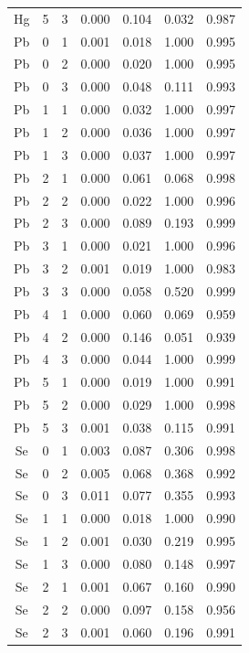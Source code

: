 \documentclass[ms, hidelinks]{uncgdissertationexp3}
\theoremstyle{plain}
\theoremstyle{definition}
\theoremstyle{remark}
\begin{document}
\begin{longtable}{ccccccc}
  Hg & 5 & 3 & 0.000 & 0.104 & 0.032 & 0.987\\
  \rowcolor{gray!6}  Pb & 0 & 1 & 0.001 & 0.018 & 1.000 & 0.995\\
  Pb & 0 & 2 & 0.000 & 0.020 & 1.000 & 0.995\\
  \rowcolor{gray!6}  Pb & 0 & 3 & 0.000 & 0.048 & 0.111 & 0.993\\
  Pb & 1 & 1 & 0.000 & 0.032 & 1.000 & 0.997\\
  \rowcolor{gray!6}  Pb & 1 & 2 & 0.000 & 0.036 & 1.000 & 0.997\\
  Pb & 1 & 3 & 0.000 & 0.037 & 1.000 & 0.997\\
  \rowcolor{gray!6}  Pb & 2 & 1 & 0.000 & 0.061 & 0.068 & 0.998\\
  Pb & 2 & 2 & 0.000 & 0.022 & 1.000 & 0.996\\
  \rowcolor{gray!6}  Pb & 2 & 3 & 0.000 & 0.089 & 0.193 & 0.999\\
  Pb & 3 & 1 & 0.000 & 0.021 & 1.000 & 0.996\\
  \rowcolor{gray!6}  Pb & 3 & 2 & 0.001 & 0.019 & 1.000 & 0.983\\
  Pb & 3 & 3 & 0.000 & 0.058 & 0.520 & 0.999\\
  \rowcolor{gray!6}  Pb & 4 & 1 & 0.000 & 0.060 & 0.069 & 0.959\\
  Pb & 4 & 2 & 0.000 & 0.146 & 0.051 & 0.939\\
  \rowcolor{gray!6}  Pb & 4 & 3 & 0.000 & 0.044 & 1.000 & 0.999\\
  Pb & 5 & 1 & 0.000 & 0.019 & 1.000 & 0.991\\
  \rowcolor{gray!6}  Pb & 5 & 2 & 0.000 & 0.029 & 1.000 & 0.998\\
  Pb & 5 & 3 & 0.001 & 0.038 & 0.115 & 0.991\\
  \rowcolor{gray!6}  Se & 0 & 1 & 0.003 & 0.087 & 0.306 & 0.998\\
  Se & 0 & 2 & 0.005 & 0.068 & 0.368 & 0.992\\
  \rowcolor{gray!6}  Se & 0 & 3 & 0.011 & 0.077 & 0.355 & 0.993\\
  Se & 1 & 1 & 0.000 & 0.018 & 1.000 & 0.990\\
  \rowcolor{gray!6}  Se & 1 & 2 & 0.001 & 0.030 & 0.219 & 0.995\\
  Se & 1 & 3 & 0.000 & 0.080 & 0.148 & 0.997\\
  \rowcolor{gray!6}  Se & 2 & 1 & 0.001 & 0.067 & 0.160 & 0.990\\
  Se & 2 & 2 & 0.000 & 0.097 & 0.158 & 0.956\\
  \rowcolor{gray!6}  Se & 2 & 3 & 0.001 & 0.060 & 0.196 & 0.991\\

\end{longtable}
\end{document}
